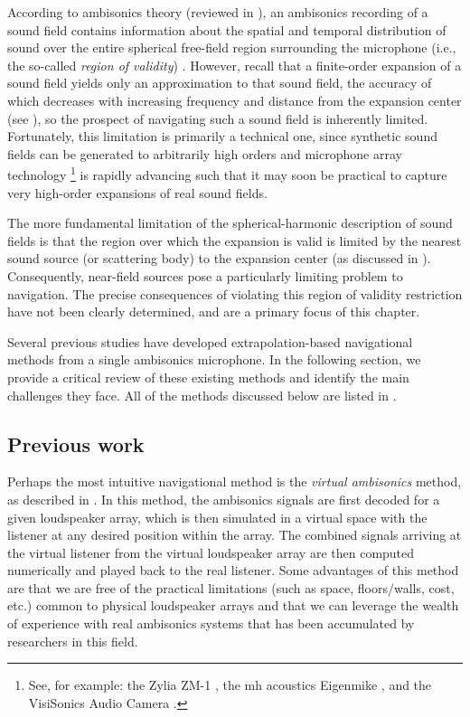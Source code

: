 According to ambisonics theory (reviewed in ), an ambisonics recording of a sound field contains information about the spatial and temporal distribution of sound over the entire spherical free-field region surrounding the microphone (i.e., the so-called \textit{region of validity}) \citep{Williams1999,GumerovDuraiswami2005,Zotter2009PhD}.
However, recall that a finite-order expansion of a sound field yields only an approximation to that sound field, the accuracy of which decreases with increasing frequency and distance from the expansion center \citep{Poletti2005,WardAbhayapala2001} (see ), so the prospect of navigating such a sound field is inherently limited.
Fortunately, this limitation is primarily a technical one, since synthetic sound fields can be generated to arbitrarily high orders and microphone array technology%
\footnote{See, for example: the Zylia ZM-1 \citep{ZyliaZM1URL}, the mh acoustics Eigenmike \citep{EigenmikeURL}, and the VisiSonics Audio Camera \citep{VisiSonicsAudioCameraURL}.}
is rapidly advancing such that it may soon be practical to capture very high-order expansions of real sound fields.

The more fundamental limitation of the spherical-harmonic description of sound fields is that the region over which the expansion is valid is limited by the nearest sound source (or scattering body) to the expansion center (as discussed in ).
Consequently, near-field sources pose a particularly limiting problem to navigation.
The precise consequences of violating this region of validity restriction have not been clearly determined, and are a primary focus of this chapter.

Several previous studies have developed extrapolation-based navigational methods from a single ambisonics microphone.
In the following section, we provide a critical review of these existing methods and identify the main challenges they face.
All of the methods discussed below are listed in .

\subsection{Previous work}\label{sec:07_Characterization_Extrapolation:Previous_Work}
Perhaps the most intuitive navigational method is the \textit{virtual ambisonics} method, as described in .
In this method, the ambisonics signals are first decoded for a given loudspeaker array, which is then simulated in a virtual space with the listener at any desired position within the array.
The combined signals arriving at the virtual listener from the virtual loudspeaker array are then computed numerically and played back to the real listener.
Some advantages of this method are that we are free of the practical limitations (such as space, floors/walls, cost, etc.) common to physical loudspeaker arrays and that we can leverage the wealth of experience with real ambisonics systems that has been accumulated by researchers in this field.

